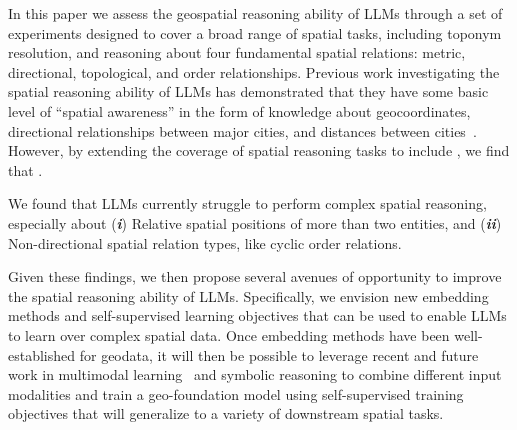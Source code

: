 In this paper we assess the geospatial reasoning ability of LLMs through a set of experiments designed to cover a broad range of spatial tasks, including toponym resolution, and reasoning about four fundamental spatial relations: metric, directional, topological, and order relationships. 
Previous work investigating the spatial reasoning ability of LLMs has demonstrated that they have some basic level of ``spatial awareness'' in the form of knowledge about geocoordinates, directional relationships between major cities, and distances between cities~\cite{Bhandari2023, Qi2023}.
However, by extending the coverage of spatial reasoning tasks to include , we find that .




We found that LLMs currently struggle to perform complex spatial reasoning, especially about
%
(\textit{\textbf{i}}) Relative spatial positions of more than two entities, and 
(\textit{\textbf{ii}}) Non-directional spatial relation types, like cyclic order relations.



Given these findings, we then propose several avenues of opportunity to improve the spatial reasoning ability of LLMs.
Specifically, we envision new embedding methods and self-supervised learning objectives that can be used to enable LLMs to learn over complex spatial data.
Once embedding methods have been well-established for geodata, it will then be possible to leverage recent and future work in multimodal learning~\cite{Xue2023, Trappolini2023} and symbolic reasoning  to combine different input modalities and train a geo-foundation model using self-supervised training objectives that will generalize to a variety of downstream spatial tasks.



